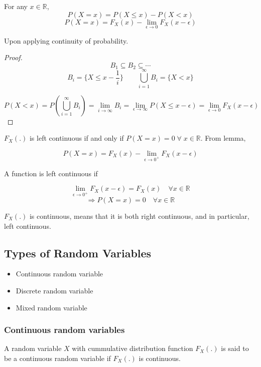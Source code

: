 \documentclass{article}
\begin{document}
\begin{lemma}
    For any $x \in \mathbb{R}$,
    $$ P(X=x)= P(X \leq x)- P(X <x)$$
    $$ P(X=x)= F_X(x)- \lim_{\epsilon \to 0}F_X(x- \epsilon)$$

\end{lemma}

Upon applying continuity of probability.

\begin{proof}
    $$ B_1 \subseteq B_2 \subseteq \cdots$$
    $$B_i=\{ X \leq x - \frac{1}{i}\} \qquad \bigcup_{i=1}^{\infty}B_i=\{ X<x\}$$

    $$ P(X<x)= P(\bigcup_{i=1}^{\infty}B_i)= \lim_{i \to \infty} B_i = \lim_{\epsilon \to \infty}P(X \leq x- \epsilon)= \lim_{\epsilon \to 0}F_X(x-\epsilon)$$
\end{proof}
\begin{corollary}
    $F_X(.)$ is left continuous if and only if $P(X=x)=0 \; \forall \; x \in \mathbb{R} $. From lemma,

    $$ P(X=x)= F_X(x)- \lim_{\epsilon \to 0^+ }F_X(x-\epsilon)$$

\end{corollary}

A function is left continuous if

$$  \lim_{\epsilon \to 0^+}F_X(x - \epsilon)= F_X(x) \quad \forall x \in \mathbb{R}$$
$$ \Rightarrow P(X=x)= 0 \quad \forall x \in \mathbb{R}$$

$F_X(.)$ is continuous, means that it is both right continuous, and in particular, left continuous.

\subsection{Types of Random Variables}
\begin{itemize}
    \item Continuous random variable
    \item Discrete random variable
    \item Mixed random variable
\end{itemize}

\subsubsection{Continuous random variables}
A random variable $X$ with cummulative distribution function $F_X(.)$ is said to be a continuous random variable if $F_X(.)$ is continuous.
\end{document}
